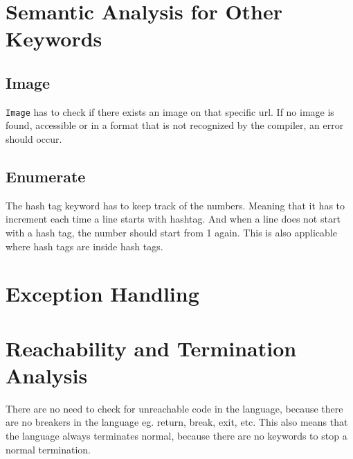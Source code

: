 \section{Semantic Analysis for Other Keywords}
     \subsection{Image}
\texttt{Image} has to check if there exists an image on that specific url. If no image is found, accessible or in a format that is not recognized by the compiler, an error should occur.


     \subsection{Enumerate}
The hash tag keyword has to keep track of the numbers. Meaning that it has to increment each time a line starts with hashtag. And when a line does not start with a hash tag, the number should start from 1 again. This is also applicable where hash tags are inside hash tags.

\section{Exception Handling}




\section{Reachability and Termination Analysis}
There are no need to check for unreachable code in the language, because there are no breakers in the language eg. return, break, exit, etc.
This also means that the language always terminates normal, because there are no keywords to stop a normal termination. 